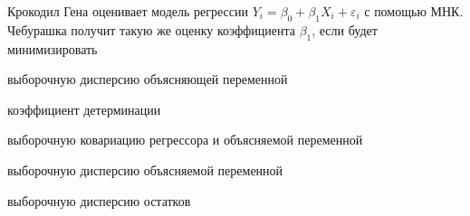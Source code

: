 
\begin{question}
Крокодил Гена оценивает модель регрессии
\(Y_i = \beta_0 + \beta_1 X_i + \varepsilon_i\) с помощью МНК. Чебурашка
получит такую же оценку коэффициента \(\beta_1\), если будет
минимизировать
\begin{answerlist}
  \item выборочную дисперсию объясняющей переменной
  \item коэффициент детерминации
  \item выборочную ковариацию регрессора и объясняемой переменной
  \item выборочную дисперсию объясняемой переменной
  \item выборочную дисперсию остатков
\end{answerlist}
\end{question}


